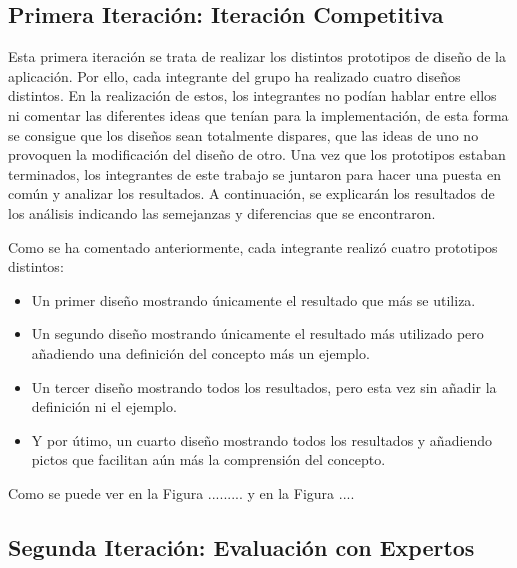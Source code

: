 \subsection{Primera Iteración: Iteración Competitiva}
\label{cap:subsec:iteracionCompetitiva}

Esta primera iteración se trata de realizar los distintos prototipos de diseño de la aplicación. Por ello, cada integrante del grupo ha realizado cuatro diseños distintos. En la realización de estos, los integrantes no podían hablar entre ellos ni comentar las diferentes ideas que tenían para la  implementación, de esta forma se consigue que los diseños sean totalmente dispares, que las ideas de uno no provoquen la modificación del diseño de otro.
Una vez que los prototipos estaban terminados, los integrantes de este trabajo se juntaron para hacer una puesta en común y analizar los resultados. A continuación, se explicarán los resultados de los análisis indicando las semejanzas y diferencias que se encontraron.

Como se ha comentado anteriormente, cada integrante realizó cuatro prototipos distintos:
\begin{itemize}
	\item Un primer diseño mostrando únicamente el resultado que más se utiliza.
	\item Un segundo diseño mostrando únicamente el resultado más utilizado pero añadiendo una definición del concepto más un ejemplo.
	\item Un tercer diseño mostrando todos los resultados, pero esta vez sin añadir la definición ni el ejemplo.
	\item Y por útimo, un cuarto diseño mostrando todos los resultados y añadiendo pictos que facilitan aún más la comprensión del concepto.
	
\end{itemize}

Como se puede ver en la Figura ......... y en la Figura ....

\subsection{Segunda Iteración: Evaluación con Expertos}
\label{cap:subsec:evaluacionExpertos}